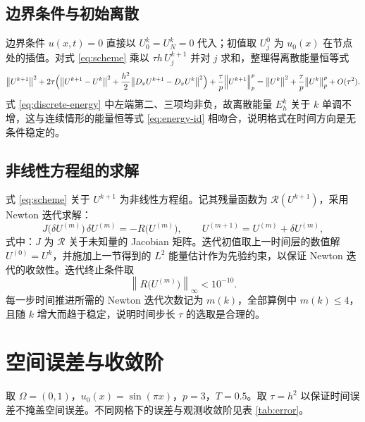 \documentclass[12pt,a4paper,twoside,openright]{ctexbook}
\numberwithin{figure}{chapter}
\numberwithin{table}{chapter}
\numberwithin{equation}{chapter}
\theoremstyle{ncwuthm}
\newcommand{\norm}[1]{\left\lVert #1 \right\rVert}
\begin{document}
\subsection{边界条件与初始离散}
边界条件 $u(x,t)=0$ 直接以 $U_0^k=U_N^k=0$ 代入；初值取 $U_j^0$ 为 $u_0(x)$ 在节点处的插值。对式 \eqref{eq:scheme} 乘以 $\tau h\,U_j^{k+1}$ 并对 $j$ 求和，整理得离散能量恒等式
\begin{equation}
  \bigl\|U^{k+1}\bigr\|^{2} + 2\tau\Bigl(
    \bigl\|U^{k+1}-U^{k}\bigr\|^{2}
    +\frac{h^{2}}{2}\bigl\|D_x U^{k+1}-D_x U^{k}\bigr\|^{2}\Bigr)
  + \frac{\tau}{p}\Bigl\|U^{k+1}\Bigr\|_{p}^{p}
  = \bigl\|U^{k}\bigr\|^{2} + \frac{\tau}{p}\bigl\|U^{k}\bigr\|_{p}^{p} + O(\tau^{2}).
  \label{eq:discrete-energy}
\end{equation}
式 \eqref{eq:discrete-energy} 中左端第二、三项均非负，故离散能量 $E_h^k$ 关于 $k$ 单调不增，这与连续情形的能量恒等式 \eqref{eq:energy-id} 相吻合，说明格式在时间方向是无条件稳定的。

\subsection{非线性方程组的求解}
式 \eqref{eq:scheme} 关于 $U^{k+1}$ 为非线性方程组。记其残量函数为 $\mathcal{R}(U^{k+1})$，采用 Newton 迭代求解：
\begin{equation}
  J\bigl(\delta U^{(m)}\bigr)\,\delta U^{(m)}=-R\bigl(U^{(m)}\bigr),\qquad
  U^{(m+1)}=U^{(m)}+\delta U^{(m)},
  \label{eq:newton}
\end{equation}
式中：$J$ 为 $\mathcal{R}$ 关于未知量的 Jacobian 矩阵。迭代初值取上一时间层的数值解 $U^{(0)}=U^{k}$，并施加上一节得到的 $L^{2}$ 能量估计作为先验约束，以保证 Newton 迭代的收敛性。迭代终止条件取
\begin{equation}
  \norm{R\bigl(U^{(m)}\bigr)}_{\infty}<10^{-10}.
  \label{eq:newton-tol}
\end{equation}
每一步时间推进所需的 Newton 迭代次数记为 $m(k)$，全部算例中 $m(k)\leq 4$，且随 $k$ 增大而趋于稳定，说明时间步长 $\tau$ 的选取是合理的。

\section{空间误差与收敛阶}
取 $\Omega=(0,1)$，$u_0(x)=\sin(\pi x)$，$p=3$，$T=0.5$。取 $\tau=h^{2}$ 以保证时间误差不掩盖空间误差。不同网格下的误差与观测收敛阶见表 \ref{tab:error}。
\end{document}
